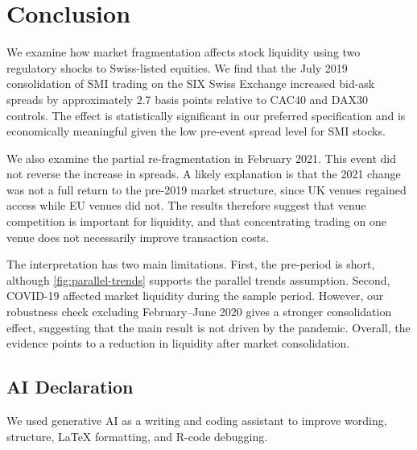 \section{Conclusion}
\label{sec:conclusion}

We examine how market fragmentation affects stock liquidity using two regulatory shocks to Swiss-listed equities. We find that the July 2019 consolidation of SMI trading on the SIX Swiss Exchange increased bid-ask spreads by approximately 2.7 basis points relative to CAC40 and DAX30 controls. The effect is statistically significant in our preferred specification and is economically meaningful given the low pre-event spread level for SMI stocks.

We also examine the partial re-fragmentation in February 2021. This event did not reverse the increase in spreads. A likely explanation is that the 2021 change was not a full return to the pre-2019 market structure, since UK venues regained access while EU venues did not. The results therefore suggest that venue competition is important for liquidity, and that concentrating trading on one venue does not necessarily improve transaction costs.

The interpretation has two main limitations. First, the pre-period is short, although \autoref{fig:parallel-trends} supports the parallel trends assumption. Second, COVID-19 affected market liquidity during the sample period. However, our robustness check excluding February--June 2020 gives a stronger consolidation effect, suggesting that the main result is not driven by the pandemic. Overall, the evidence points to a reduction in liquidity after market consolidation.

\subsection*{AI Declaration}

We used generative AI as a writing and coding assistant to improve wording, structure, LaTeX formatting, and R-code debugging. 